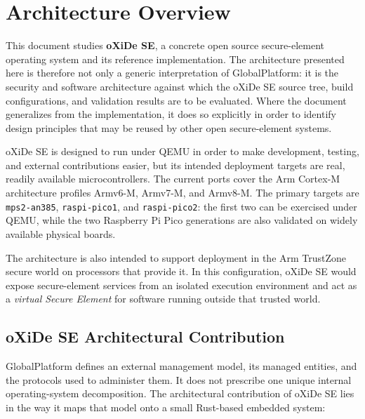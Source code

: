 \chapter{Architecture Overview}

This document studies \textbf{oXiDe SE}, a concrete open source secure-element
operating system and its reference implementation. The architecture presented
here is therefore not only a generic interpretation of GlobalPlatform: it is
the security and software architecture against which the oXiDe SE source tree,
build configurations, and validation results are to be evaluated. Where the
document generalizes from the implementation, it does so explicitly in order to
identify design principles that may be reused by other open secure-element
systems.

oXiDe SE is designed to run under QEMU in order to make development, testing,
and external contributions easier, but its intended deployment targets are
real, readily available microcontrollers. The current ports cover the Arm
Cortex-M architecture profiles Armv6-M, Armv7-M, and Armv8-M. The primary
targets are \texttt{mps2-an385}, \texttt{raspi-pico1}, and
\texttt{raspi-pico2}: the first two can be exercised under QEMU, while the two
Raspberry Pi Pico generations are also validated on widely available physical
boards.

The architecture is also intended to support deployment in the Arm TrustZone
secure world on processors that provide it. In this configuration, oXiDe SE
would expose secure-element services from an isolated execution environment and
act as a \emph{virtual Secure Element} for software running outside that trusted
world.

\section{oXiDe SE Architectural Contribution}

GlobalPlatform defines an external management model, its managed entities, and
the protocols used to administer them. It does not prescribe one unique
internal operating-system decomposition. The architectural contribution of
oXiDe SE lies in the way it maps that model onto a small Rust-based embedded
system:

